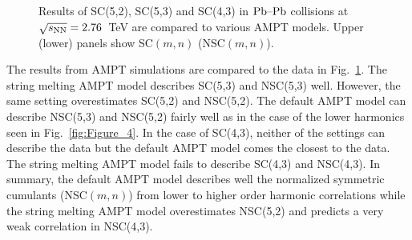 \begin{figure}[!]
\begin{center}
        \caption{Results of  SC(5,2), SC(5,3) and SC(4,3) in $\textnormal{Pb--Pb}$ collisions at $\sqrt{s_{\textnormal{NN}}}=2.76$~TeV are compared to various AMPT models. Upper (lower) panels show SC$(m,n)$ (NSC$(m,n)$).}
        \label{fig:Figure_7}
        \end{center}   
 \end{figure}
 
The results from AMPT simulations are compared to the data in Fig.~\ref{fig:Figure_7}.
The string melting AMPT model describes SC(5,3) and NSC(5,3) well. However, the same setting overestimates SC(5,2) and NSC(5,2). 
The default AMPT model can describe NSC(5,3) and NSC(5,2) fairly well as in the case of the lower harmonics seen in Fig.~\ref{fig:Figure_4}.
In the case of SC(4,3), neither of the settings can describe the data but the default AMPT model comes the closest to the data. 
The string melting AMPT model fails to describe SC(4,3) and NSC(4,3).
In summary, the default AMPT model describes well the normalized symmetric cumulants (NSC$(m,n)$) from lower to higher order harmonic correlations while the string melting AMPT model overestimates NSC(5,2) and predicts a very weak correlation in NSC(4,3). 

